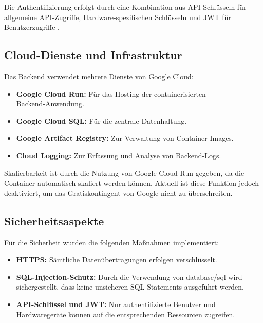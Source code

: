 Die Authentifizierung erfolgt durch eine Kombination aus API-Schlüsseln für allgemeine API-Zugriffe, 
Hardware-spezifischen Schlüsseln und JWT für Benutzerzugriffe .

\subsection{Cloud-Dienste und Infrastruktur}

Das Backend verwendet mehrere Dienste von Google Cloud:

\begin{itemize}
	\item \textbf{Google Cloud Run:} Für das Hosting der containerisierten\\
	Backend-Anwendung\cite{googlecloudrun}.
	\item \textbf{Google Cloud SQL:} Für die zentrale Datenhaltung\cite{googlecloudsql}.
	\item \textbf{Google Artifact Registry:} Zur Verwaltung von Container-Images\cite{googleartifactregistry}.
	\item \textbf{Cloud Logging:} Zur Erfassung und Analyse von Backend-Logs\cite{googlecloudlogging}.
\end{itemize}
Skalierbarkeit ist durch die Nutzung von Google Cloud Run gegeben, da die Container automatisch 
skaliert werden können. Aktuell ist diese Funktion jedoch deaktiviert, um das Gratiskontingent von 
Google nicht zu überschreiten.


\subsection{Sicherheitsaspekte}

Für die Sicherheit wurden die folgenden Maßnahmen implementiert:
\begin{itemize}
	\item \textbf{HTTPS:} Sämtliche Datenübertragungen erfolgen verschlüsselt.
	\item \textbf{SQL-Injection-Schutz:} Durch die Verwendung von database/sql wird sichergestellt, 
	dass keine unsicheren SQL-Statements ausgeführt werden.
	\item \textbf{API-Schlüssel und JWT:} Nur authentifizierte Benutzer und Hardwaregeräte können auf 
	die entsprechenden Ressourcen zugreifen.
\end{itemize}



